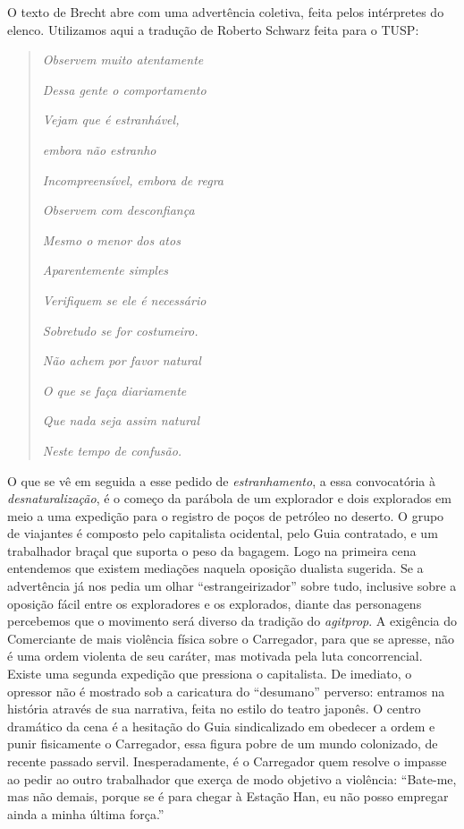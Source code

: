 O texto de Brecht abre com uma advertência coletiva, feita pelos
intérpretes do elenco. Utilizamos aqui a tradução de Roberto Schwarz
feita para o TUSP:

\begin{quote}
\textit{Observem muito atentamente}

\textit{Dessa gente o comportamento}

\textit{Vejam que é estranhável,}

\textit{embora não estranho}

\textit{Incompreensível, embora de regra}

\textit{Observem com desconfiança}

\textit{Mesmo o menor dos atos}

\textit{Aparentemente simples}

\textit{Verifiquem se ele é necessário}

\textit{Sobretudo se for costumeiro.}

\textit{Não achem por favor natural}

\textit{O que se faça diariamente}

\textit{Que nada seja assim natural}

\textit{Neste tempo de confusão.}
\end{quote}

O que se vê em seguida a esse pedido de \textit{estranhamento}, a essa
convocatória à \textit{desnaturalização}, é o começo da parábola de um
explorador e dois explorados em meio a uma expedição para o registro de
poços de petróleo no deserto. O grupo de viajantes é composto pelo
capitalista ocidental, pelo Guia contratado, e um trabalhador braçal que
suporta o peso da bagagem. Logo na primeira cena entendemos que existem
mediações naquela oposição dualista sugerida. Se a advertência já nos
pedia um olhar “estrangeirizador” sobre tudo, inclusive sobre a oposição
fácil entre os exploradores e os explorados, diante das personagens
percebemos que o movimento será diverso da tradição do \textit{agitprop}. A
exigência do Comerciante de mais violência física sobre o Carregador,
para que se apresse, não é uma ordem violenta de seu caráter, mas
motivada pela luta concorrencial. Existe uma segunda expedição que
pressiona o capitalista. De imediato, o opressor não é mostrado sob a
caricatura do “desumano” perverso: entramos na história através de sua
narrativa, feita no estilo do teatro japonês. O centro dramático da cena
é a hesitação do Guia sindicalizado em obedecer a ordem e punir
fisicamente o Carregador, essa figura pobre de um mundo colonizado, de
recente passado servil. Inesperadamente, é o Carregador quem resolve o
impasse ao pedir ao outro trabalhador que exerça de modo objetivo a
violência: “Bate-me, mas não demais, porque se é para chegar à Estação
Han, eu não posso empregar ainda a minha última força.”

